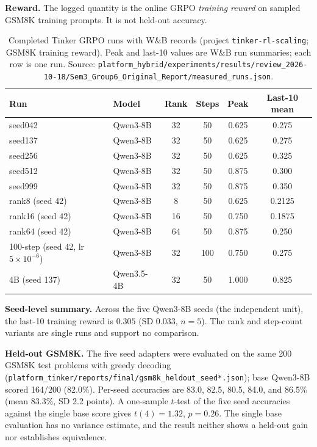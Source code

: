 \documentclass[12pt,a4paper]{report}
\theoremstyle{definition}
\begin{document}
\textbf{Reward.} The logged quantity is the online GRPO \emph{training reward} on sampled GSM8K training prompts. It is not held-out accuracy.

\begin{table}[htbp]
\centering
\caption{Completed Tinker GRPO runs with W\&B records (project \texttt{tinker-rl-scaling}; GSM8K training reward). Peak and last-10 values are W\&B run summaries; each row is one run. Source: \texttt{platform\_hybrid/experiments/results/review\_2026-10-18/Sem3\_Group6\_Original\_Report/measured\_runs.json}.}
\label{tab:measured_runs}
\begin{tabular}{llcccc}
\toprule
\textbf{Run} & \textbf{Model} & \textbf{Rank} & \textbf{Steps} & \textbf{Peak} & \textbf{Last-10 mean} \\
\midrule
seed042 & Qwen3-8B & 32 & 50 & 0.625 & 0.275 \\
seed137 & Qwen3-8B & 32 & 50 & 0.625 & 0.275 \\
seed256 & Qwen3-8B & 32 & 50 & 0.625 & 0.325 \\
seed512 & Qwen3-8B & 32 & 50 & 0.875 & 0.300 \\
seed999 & Qwen3-8B & 32 & 50 & 0.875 & 0.350 \\
rank8 (seed 42) & Qwen3-8B & 8 & 50 & 0.625 & 0.2125 \\
rank16 (seed 42) & Qwen3-8B & 16 & 50 & 0.750 & 0.1875 \\
rank64 (seed 42) & Qwen3-8B & 64 & 50 & 0.875 & 0.250 \\
100-step (seed 42, lr $5\times10^{-6}$) & Qwen3-8B & 32 & 100 & 0.750 & 0.275 \\
4B (seed 137) & Qwen3.5-4B & 32 & 50 & 1.000 & 0.825 \\
\bottomrule
\end{tabular}
\end{table}

\textbf{Seed-level summary.} Across the five Qwen3-8B seeds (the independent unit), the last-10 training reward is $0.305$ (SD $0.033$, $n=5$). The rank and step-count variants are single runs and support no comparison.

\textbf{Held-out GSM8K.} The five seed adapters were evaluated on the same 200 GSM8K test problems with greedy decoding (\texttt{platform\_tinker/reports/final/gsm8k\_heldout\_seed*.json}); base Qwen3-8B scored 164/200 (82.0\%). Per-seed accuracies are 83.0, 82.5, 80.5, 84.0, and 86.5\% (mean 83.3\%, SD 2.2 points). A one-sample $t$-test of the five seed accuracies against the single base score gives $t(4)=1.32$, $p=0.26$. The single base evaluation has no variance estimate, and the result neither shows a held-out gain nor establishes equivalence.
\end{document}
